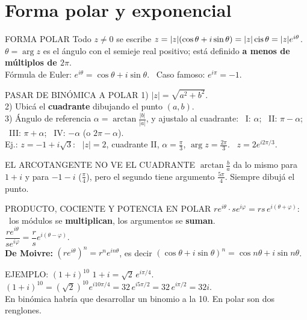\section{Forma polar y exponencial}
\begin{sello}{FORMA POLAR}
Todo $z\neq0$ se escribe $z=|z|(\cos\theta+i\sin\theta)=|z|\operatorname{cis}\theta=|z|e^{i\theta}$.\\[2pt]
$\theta=\arg z$ es el ángulo con el semieje real positivo; está definido \textbf{a menos de múltiplos de $2\pi$}.\\[2pt]
Fórmula de Euler: $e^{i\theta}=\cos\theta+i\sin\theta$. \ Caso famoso: $e^{i\pi}=-1$.
\end{sello}
\begin{metodo}{PASAR DE BINÓMICA A POLAR}
1) $|z|=\sqrt{a^2+b^2}$.\\
2) Ubicá el \textbf{cuadrante} dibujando el punto $(a,b)$.\\
3) Ángulo de referencia $\alpha=\arctan\frac{|b|}{|a|}$, y ajustalo al cuadrante: \ I: $\alpha$; \ II: $\pi-\alpha$; \ III: $\pi+\alpha$; \ IV: $-\alpha$ (o $2\pi-\alpha$).\\
Ej.: $z=-1+i\sqrt3$: \ $|z|=2$, cuadrante II, $\alpha=\frac\pi3$, $\arg z=\frac{2\pi}3$. \ $z=2e^{i2\pi/3}$.
\end{metodo}
\begin{trampa}{EL ARCOTANGENTE NO VE EL CUADRANTE}
$\arctan\frac{b}{a}$ da lo mismo para $1+i$ y para $-1-i$ ($\frac\pi4$), pero el segundo tiene argumento $\frac{5\pi}4$. Siempre dibujá el punto.
\end{trampa}
\begin{sello}{PRODUCTO, COCIENTE Y POTENCIA EN POLAR}
$r e^{i\theta}\cdot s e^{i\varphi}=rs\,e^{i(\theta+\varphi)}$: \ los módulos se \textbf{multiplican}, los argumentos se \textbf{suman}.\\[2pt]
$\dfrac{re^{i\theta}}{se^{i\varphi}}=\dfrac rs e^{i(\theta-\varphi)}$.\\[2pt]
\textbf{De Moivre:} $(re^{i\theta})^n=r^ne^{in\theta}$, es decir $(\cos\theta+i\sin\theta)^n=\cos n\theta+i\sin n\theta$.
\end{sello}
\begin{memo}{EJEMPLO: $(1+i)^{10}$}
$1+i=\sqrt2\,e^{i\pi/4}$. \ $(1+i)^{10}=(\sqrt2)^{10}e^{i10\pi/4}=32\,e^{i5\pi/2}=32\,e^{i\pi/2}=32i$.\\
En binómica habría que desarrollar un binomio a la 10. En polar son dos renglones.
\end{memo}

